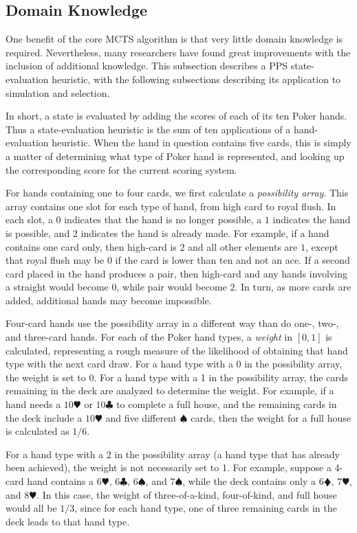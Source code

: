 \documentclass[letterpaper]{article}
\begin{document}
\subsection{Domain Knowledge}

One benefit of the core MCTS algorithm is that very little domain knowledge is required. Nevertheless, many researchers have found great improvements with the inclusion of additional knowledge. This subsection describes a PPS state-evaluation heuristic, with the following subsections describing its application to simulation and selection.

In short, a state is evaluated by adding the scores of each of its ten Poker hands. Thus a state-evaluation heuristic is the sum of ten applications of a hand-evaluation heuristic. When the hand in question contains five cards, this is simply a matter of determining what type of Poker hand is represented, and looking up the corresponding score for the current scoring system.

For hands containing one to four cards, we first calculate a {\it possibility array}. This array contains one slot for each type of hand, from high card to royal flush. In each slot, a $0$ indicates that the hand is no longer possible, a $1$ indicates the hand is possible, and $2$ indicates the hand is already made. For example, if a hand contains one card only, then high-card is $2$ and all other elements are $1$, except that royal flush may be $0$ if the card is lower than ten and not an ace. If a second card placed in the hand produces a pair, then high-card and any hands involving a straight would become $0$, while pair would become $2$. In turn, as more cards are added, additional hands may become impossible.

Four-card hands use the possibility array in a different way than do one-, two-, and three-card hands. For each of the Poker hand types, a {\it weight} in $[0,1]$ is calculated, representing a rough measure of the likelihood of obtaining that hand type with the next card draw. For a hand type with a 0 in the possibility array, the weight is set to 0. For a hand type with a 1 in the possibility array, the cards remaining in the deck are analyzed to determine the weight. For example, if a hand needs a $10\varheartsuit$ or $10\clubsuit$ to complete a full house, and the remaining cards in the deck include a $10\varheartsuit$ and five different $\spadesuit$ cards, then the weight for a full house is calculated as $1 / 6$. 

For a hand type with a 2 in the possibility array (a hand type that has already been achieved), the weight is not necessarily set to 1. For example, suppose a 4-card hand contains a $6\varheartsuit$, $6\clubsuit$, $6\spadesuit$, and $7\spadesuit$, while the deck contains only a $6\vardiamondsuit$, $7\varheartsuit$, and $8\varheartsuit$. In this case, the weight of three-of-a-kind, four-of-kind, and full house would all be $1/3$, since for each hand type, one of three remaining cards in the deck leads to that hand type.
\end{document}
